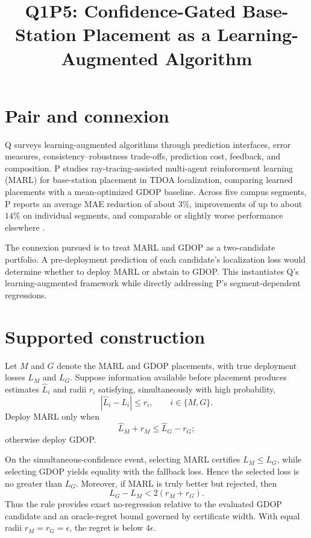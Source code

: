 \documentclass{article}
\title{Q1P5: Confidence-Gated Base-Station Placement as a Learning-Augmented Algorithm}
\begin{document}
\maketitle

\section{Pair and connexion}

Q surveys learning-augmented algorithms through prediction interfaces, error measures, consistency--robustness trade-offs, prediction cost, feedback, and composition. P studies ray-tracing-assisted multi-agent reinforcement learning (MARL) for base-station placement in TDOA localization, comparing learned placements with a mean-optimized GDOP baseline. Across five campus segments, P reports an average MAE reduction of about \(3\%\), improvements of up to about \(14\%\) on individual segments, and comparable or slightly worse performance elsewhere .

The connexion pursued is to treat MARL and GDOP as a two-candidate portfolio. A pre-deployment prediction of each candidate's localization loss would determine whether to deploy MARL or abstain to GDOP. This instantiates Q's learning-augmented framework while directly addressing P's segment-dependent regressions.

\section{Supported construction}

Let \(M\) and \(G\) denote the MARL and GDOP placements, with true deployment losses \(L_M\) and \(L_G\). Suppose information available before placement produces estimates \(\widehat L_i\) and radii \(r_i\) satisfying, simultaneously with high probability,
\[
  \left|\widehat L_i-L_i\right|\leq r_i,
  \qquad i\in\{M,G\}.
\]
Deploy MARL only when
\[
  \widehat L_M+r_M\leq \widehat L_G-r_G;
\]
otherwise deploy GDOP.

On the simultaneous-confidence event, selecting MARL certifies \(L_M\leq L_G\), while selecting GDOP yields equality with the fallback loss. Hence the selected loss is no greater than \(L_G\). Moreover, if MARL is truly better but rejected, then
\[
  L_G-L_M < 2(r_M+r_G).
\]
Thus the rule provides exact no-regression relative to the evaluated GDOP candidate and an oracle-regret bound governed by certificate width. With equal radii \(r_M=r_G=\epsilon\), the regret is below \(4\epsilon\).
\end{document}
